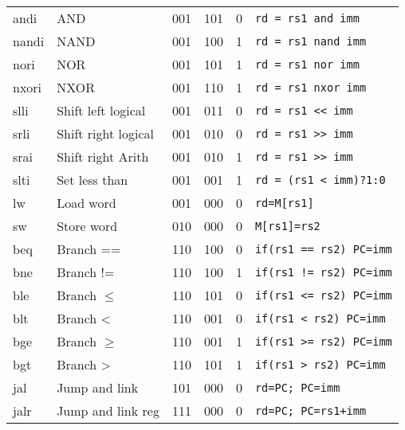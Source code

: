 \documentclass[a4paper]{article}
\begin{document}
\begin{tabular}{|l|l|c|c|c|l|}
        andi  & AND                  & 001    & 101    & 0      & \texttt{rd = rs1 and imm}   \\
        nandi & NAND                 & 001    & 100    & 1      & \texttt{rd = rs1 nand imm}    \\
        nori  & NOR                  & 001    & 101    & 1      & \texttt{rd = rs1 nor imm}     \\
        nxori & NXOR                 & 001    & 110    & 1      & \texttt{rd = rs1 nxor imm}    \\
        slli  & Shift left logical   & 001    & 011    & 0      & \texttt{rd = rs1 << imm}      \\
        srli  & Shift right logical  & 001    & 010    & 0      & \texttt{rd = rs1 >> imm}      \\
        srai  & Shift right Arith    & 001    & 010    & 1      & \texttt{rd = rs1 >> imm}      \\
        slti  & Set less than        & 001    & 001    & 1      & \texttt{rd = (rs1 < imm)?1:0} \\
        \hline
        lw    & Load word            & 001    & 000    & 0      & \texttt{rd=M[rs1]}            \\
        sw    & Store word           & 010    & 000    & 0      & \texttt{M[rs1]=rs2}           \\
        \hline
        beq   & Branch ==            & 110    & 100    & 0      & \texttt{if(rs1 == rs2) PC=imm}\\
        bne   & Branch !=            & 110    & 100    & 1      & \texttt{if(rs1 != rs2) PC=imm}\\
        ble   & Branch \(\leqslant\) & 110    & 101    & 0      & \texttt{if(rs1 <= rs2) PC=imm}\\
        blt   & Branch <             & 110    & 001    & 0      & \texttt{if(rs1 < rs2) PC=imm} \\
        bge   & Branch \(\geqslant\) & 110    & 001    & 1      & \texttt{if(rs1 >= rs2) PC=imm}\\
        bgt   & Branch >             & 110    & 101    & 1      & \texttt{if(rs1 > rs2) PC=imm} \\

        \hline
        jal  & Jump and link        & 101    & 000    & 0      &\texttt{rd=PC; PC=imm}         \\
        jalr & Jump and link reg    & 111    & 000    & 0      &\texttt{rd=PC; PC=rs1+imm}     \\
        \hline
    \end{tabular}
    
\end{document}
